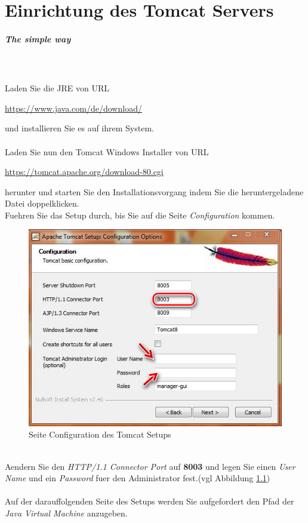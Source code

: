 \documentclass[a4paper, 12pt]{scrreprt}
\begin{document}
\chapter{Einrichtung des Tomcat Servers}
\paragraph{The simple way}\ \\
\ \\
Laden Sie die JRE von URL
\begin{center}
	 \url{https://www.java.com/de/download/}
\end{center}
und installieren Sie es auf ihrem System.\ \\
\ \\
Laden Sie nun den Tomcat Windows Installer von URL 
\begin{center}
	\url{https://tomcat.apache.org/download-80.cgi}
\end{center}
herunter und starten Sie den Installationsvorgang indem Sie die heruntergeladene Datei doppelklicken.\\
Fuehren Sie das Setup durch, bis Sie auf die Seite {\it Configuration} kommen.
\begin{figure}[h]
\centering
\includegraphics[width=0.8\linewidth]{Grafiken/TomcatInstall1}
\caption{Seite Configuration des Tomcat Setups}
\label{fig:TomcatInstall1}
\end{figure}\\
Aendern Sie den {\it HTTP/1.1 Connector Port} auf \textbf{8003} und legen Sie einen {\it User Name} und ein {\it Password} fuer den Administrator fest.(vgl Abbildung \ref{fig:TomcatInstall1})\\
\ \\
Auf der darauffolgenden Seite des Setups werden Sie aufgefordert den Pfad der {\it Java Virtual Machine} anzugeben.\\
\end{document}
